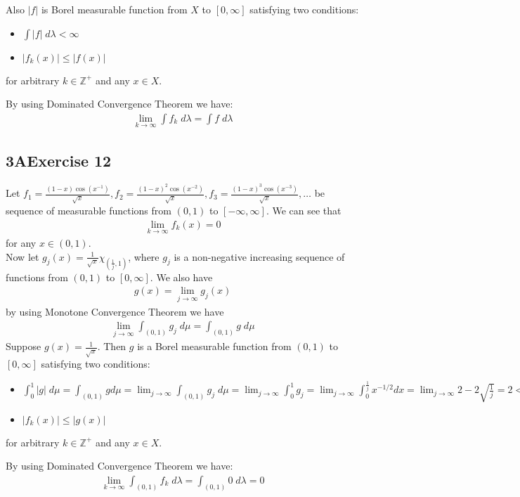 \documentclass[12pt, letterpaper]{article}
\newcommand{\Z}{\mathbb{Z}}
\begin{document}
Also $|f|$ is Borel measurable function from $X$ to $[0,\infty]$ satisfying two conditions:
\begin{itemize}
    \item $\int |f|\; d\lambda<\infty$
    \item $|f_k(x)|\leq |f(x)|$
\end{itemize}
for arbitrary $k\in\Z^+$ and any $x\in X$.

By using Dominated Convergence Theorem we have:
\begin{align*}
    \lim_{k\rightarrow \infty} \int f_k\; d\lambda=\int f\; d\lambda
\end{align*}
\clearpage

\subsection*{3\hspace{1pt}A\hspace{20pt}Exercise 12}
Let $f_1=\frac{(1-x)\cos(x^{-1})}{\sqrt{x}}, f_2=\frac{(1-x)^2\cos(x^{-2})}{\sqrt{x}}, f_3=\frac{(1-x)^3\cos(x^{-3})}{\sqrt{x}},\dots$ be sequence of measurable functions from $(0,1)$ to $[-\infty, \infty]$. We can see that
\begin{align*}
    \lim_{k\rightarrow \infty} f_k(x)=0
\end{align*}
for any $x\in (0,1)$.\\

Now let $g_j(x)=\frac{1}{\sqrt{x}}\chi_{(\frac{1}{j},1)}$, where $g_j$ is a non-negative increasing sequence of functions from $(0,1)$ to $[0, \infty]$.
We also have
\begin{align*}
    g(x)=\lim_{j\rightarrow\infty}g_j(x)
\end{align*}
by using Monotone Convergence Theorem we have 
\begin{align*}
    \lim_{j\rightarrow\infty}\int_{(0,1)} g_j\;d\mu=\int_{(0,1)} g\;d\mu
\end{align*}
Suppose $g(x)=\frac{1}{\sqrt{x}}$. Then $g$ is a Borel measurable function from $(0,1)$ to $[0,\infty]$ satisfying two conditions:
\begin{itemize}
    \item $\int_0^1 |g|\; d\mu=\int_{(0,1)} g d\mu=\lim_{j\rightarrow\infty}\int_{(0,1)} g_j\;d\mu=\lim_{j\rightarrow\infty}\int_0^1 g_j=\lim_{j\rightarrow\infty}\int_0^\frac{1}{j} x^{-1/2}dx= \lim_{j\rightarrow\infty}2-2\sqrt{\frac{1}{j}}=2 <\infty$
    \item $|f_k(x)|\leq |g(x)|$
\end{itemize}
for arbitrary $k\in\Z^+$ and any $x\in X$.

By using Dominated Convergence Theorem we have:
\begin{align*}
    \lim_{k\rightarrow \infty} \int_{(0,1)} f_k\; d\lambda=\int_{(0,1)} 0\; d\lambda=0
\end{align*}
\clearpage
\end{document}
